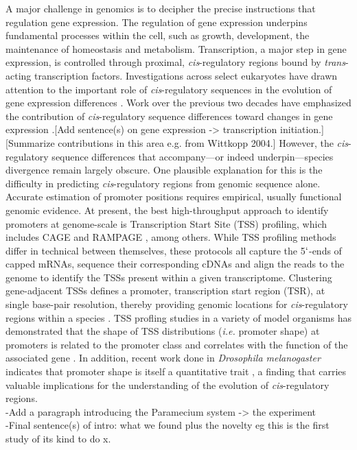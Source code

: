 \documentclass[nogrid]{MBE}%
\begin{document}
A major challenge in genomics is to decipher the precise instructions that regulation gene expression. The regulation of gene expression underpins fundamental processes within the cell, such as growth, development, the maintenance of homeostasis and metabolism. Transcription, a major step in gene expression, is controlled through proximal, \textit{cis}-regulatory regions bound by \textit{trans}-acting transcription factors. Investigations across select eukaryotes have drawn attention to the important role of \textit{cis}-regulatory sequences in the evolution of gene expression differences \citep{Wittkopp:2008ki, Wittkopp:2011bc, Siepel:2014hd}. Work over the previous two decades have emphasized the contribution of \textit{cis}-regulatory sequence differences toward changes in gene expression \citep{Wittkopp:2004cy}.[Add sentence(s) on gene expression -> transcription initiation.] [Summarize contributions in this area e.g. from Wittkopp 2004.] However, the \textit{cis}-regulatory sequence differences that accompany---or indeed underpin---species divergence remain largely obscure. One plausible explanation for this is the difficulty in predicting \textit{cis}-regulatory regions from genomic sequence alone. Accurate estimation of promoter positions requires empirical, usually functional genomic evidence. At present, the best high-throughput approach to identify promoters at genome-scale is Transcription Start Site (TSS) profiling, which includes CAGE \citep{Murata:2014gpb} and RAMPAGE \citep{Batut:2013fu}, among others. While TSS profiling methods differ in technical between themselves, these protocols all capture the 5$`$-ends of capped mRNAs, sequence their corresponding cDNAs and align the reads to the genome to identify the TSSs present within a given transcriptome. Clustering gene-adjacent TSSs defines a promoter, transcription start region (TSR), at single base-pair resolution, thereby providing genomic locations for \textit{cis}-regulatory regions within a species \citep{Lenhard:2012ena,Rach:2009ct}. TSS profling studies in a variety of model organisms has demonstrated that the shape of TSS distributions (\textit{i.e.} promoter shape) at promoters is related to the promoter class and correlates with the function of the associated gene \citep{Carninci:2006in, Rach:2009ct,Hoskins:2011io,Raborn:2016cr}. In addition, recent work done in \textit{Drosophila melanogaster} indicates that promoter shape is itself a quantitative trait \citep{Schor:2017fw}, a finding that carries valuable implications for the understanding of the evolution of \textit{cis}-regulatory regions. \\ 
-Add a paragraph introducing the Paramecium system -> the experiment\\
-Final sentence(s) of intro: what we found plus the novelty eg this is the first study of its kind to do x.
\end{document}
